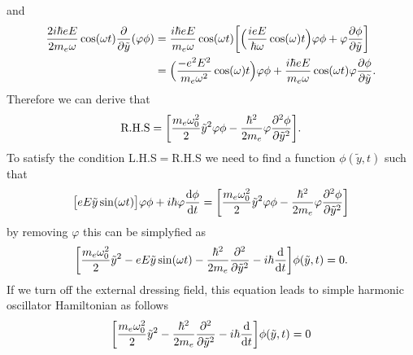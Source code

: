 and
\begin{equation} \label{1.26}
  \begin{aligned}
    \frac{2i\hbar eE}{2m_e\omega}\cos(\omega t) \pdv{\tilde{y}} (\varphi\phi)& =
    \frac{i\hbar eE}{m_e\omega}\cos(\omega t)
    \bigg[
      \Big(\frac{ieE}{\hbar \omega} \cos(\omega)t\Big)\varphi\phi +
      \varphi\pdv{\phi}{\tilde{y}}
    \bigg] \\
    & =
    \Big(\frac{-e^2E^2}{m_e\omega^2} \cos(\omega)t\Big)\varphi\phi +
    \frac{i\hbar eE}{m_e\omega}\cos(\omega t)\varphi\pdv{\phi}{\tilde{y}}.
  \end{aligned}
\end{equation}
Therefore we can derive that
\begin{equation} \label{1.27}
  \begin{aligned}
    \text{R.H.S} =
    \bigg[
    \frac{m_e \omega_0^2}{2}\tilde{y}^2 \varphi\phi
    -
    \frac{\hbar^2}{2m_e}
    \varphi\pdv[2]{\phi}{\tilde{y}} \bigg].
  \end{aligned}
\end{equation}
To satisfy the condition L.H.S$=$R.H.S we need to find a function $\phi(\tilde{y},t)$ such that
\begin{equation} \label{1.28}
  \begin{aligned}
    \big[{eE\tilde{y}}\sin(\omega t)\big]\varphi\phi +
    i \hbar\varphi  \dv{\phi}{t}
    =
    \bigg[
    \frac{m_e \omega_0^2}{2}\tilde{y}^2 \varphi\phi
    -
    \frac{\hbar^2}{2m_e}
    \varphi\pdv[2]{\phi}{\tilde{y}} \bigg]
  \end{aligned}
\end{equation}
by removing $\varphi$ this can be simplyfied as
\begin{equation} \label{1.29}
  \begin{aligned}
    \bigg[
    \frac{m_e \omega_0^2}{2}\tilde{y}^2
    - {eE\tilde{y}}\sin(\omega t)
    -
    \frac{\hbar^2}{2m_e}
    \pdv[2]{\tilde{y}}
    - i \hbar \dv{t}
    \bigg]
    \phi(\tilde{y},t) = 0.
  \end{aligned}
\end{equation}
If we turn off the external dressing field, this equation leads to simple harmonic oscillator Hamiltonian as follows
\begin{equation} \label{1.30}
  \begin{aligned}
    \bigg[
    \frac{m_e \omega_0^2}{2}\tilde{y}^2
    -
    \frac{\hbar^2}{2m_e}
    \pdv[2]{\tilde{y}}
    - i \hbar \dv{t}
    \bigg]
    \phi(\tilde{y},t) = 0
  \end{aligned}
\end{equation}
